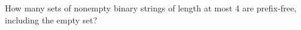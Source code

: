 How many sets of nonempty binary strings of length at most 4 are prefix-free, including the empty set?
